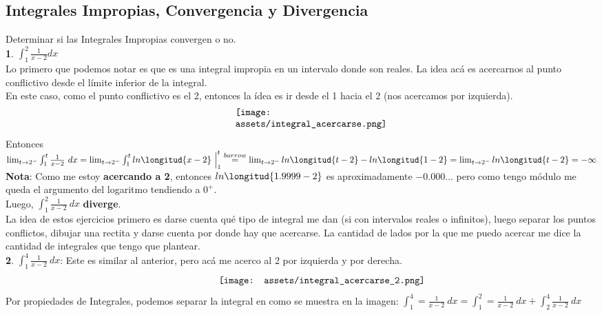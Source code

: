 \documentclass[10pt,a4paper]{article}
\begin{document}
\subsection*{Integrales Impropias, Convergencia y Divergencia}
\label{subsec:integrales_impropias_convergencia}
Determinar si las Integrales Impropias convergen o no. \\
\textbf{1}. $\int^{2}_{1} \frac{1}{x-2} dx$ \\
Lo primero que podemos notar es que es una integral impropia en un intervalo donde son reales. La idea acá es acercarnos al punto conflictivo desde el límite inferior de la integral. \\
En este caso, como el punto conflictivo es el 2, entonces la ídea es ir desde el 1 hacia el 2 (nos acercamos por izquierda). \\
\[\begin{minipage}[b]{0.4\textwidth}
    \texttt{[image: assets/integral\_acercarse.png]}
\end{minipage}\]
Entonces $\lim_{t \to 2^{-}} \int^{t}_{1}\frac{1}{x-2} \ dx = \lim_{t \to 2^{-}} \int^{t}_{1} ln \longitud{x-2} \ \Big|^{t}_{1}  \stackrel{barrow}{=} \lim_{t \to 2^{-}} ln \longitud{t-2} - ln \longitud{1-2} =  \lim_{t \to 2^{-}} ln \longitud{t-2} = -\infty $ \\
\textbf{Nota}: Como me estoy \textbf{acercando a 2}, entonces $ln \longitud{1.9999-2}$ es aproximadamente $-0.000 \dots$ pero como tengo módulo me queda el argumento del logaritmo tendiendo a $0^{+}$. \\
Luego, $\int^{2}_{1} \frac{1}{x-2} \ dx$ \textbf{ diverge}. \\
La idea de estos ejercicios primero es darse cuenta qué tipo de integral me dan (si con intervalos reales o infinitos), luego separar los puntos conflictos, dibujar una rectita y darse cuenta por donde hay que acercarse. La cantidad de lados por la que me puedo acercar me dice la cantidad de integrales que tengo que plantear. \\
\textbf{2}. $\int^{4}_{1} \frac{1}{x-2} \ dx$: Este es similar al anterior, pero acá me acerco al 2 por izquierda y por derecha.
\[\begin{minipage}[b]{0.5\textwidth}
    \texttt{[image: assets/integral\_acercarse\_2.png]}
\end{minipage}\]
Por propiedades de Integrales, podemos separar la integral en como se muestra en la imagen: $\int^{4}_{1} = \frac{1}{x-2} \ dx = \int^{2}_{1} = \frac{1}{x-2} \ dx + \int^{4}_{2} \frac{1}{x-2} \ dx$ \\
\end{document}
